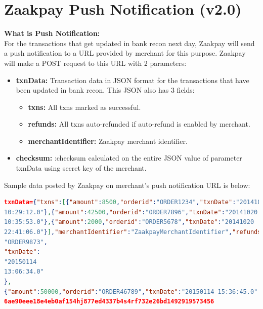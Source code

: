 \documentclass{article}
\begin{document}
\section{Zaakpay Push Notification (v2.0)}
{\bfseries What   is   Push Notification:}\\
For   the   transactions   that   get   updated   in   bank   recon   next   day,  
Zaakpay   will   send   a   push   notification   to   a   URL   provided   by   merchant   for   this   purpose.   Zaakpay  
will make a POST request to this URL with 2 parameters:  
\begin{itemize}
\item {\bfseries txnData:}   Transaction   data   in   JSON   format   for   the   transactions   that   have   been   updated   in  
bank recon. This JSON also has 3 fields: 
\begin{itemize}
\item {\bfseries txns:} All txns marked as successful. 
\item {\bfseries refunds:} All txns auto-refunded if auto-refund is enabled by merchant. 
\item {\bfseries merchantIdentifier:} Zaakpay merchant identifier.
\end{itemize}
  
 \item {\bfseries checksum:} :checksum   calculated   on   the   entire   JSON value   of   parameter   txnData   using  secret key of the merchant.  
\end{itemize}
Sample data posted by Zaakpay on merchant's push notification URL is below:  
\begin{lstlisting}[language=json,breaklines=true]
txnData={"txns":[{"amount":8500,"orderid":"ORDER1234","txnDate":"2014­10­20 
10:29:12.0"},{"amount":42500,"orderid":"ORDER7896","txnDate":"2014­10­20 
10:35:53.0"},{"amount":2000,"orderid":"ORDER5678","txnDate":"2014­10­20 
22:41:06.0"}],"merchantIdentifier":"ZaakpayMerchantIdentifier","refunds":   [   {   "amount":   10000,   "orderid":  
"ORDER9873",  
"txnDate":  
"2015­01­14  
13:06:34.0"  
},  
{"amount":50000,"orderid":"ORDER46789","txnDate":"2015­01­14 15:36:45.0" } ]}&checksum=5hgs40 
6ae90eee18e4eb0af154hj877ed4337b4s4rf732e26bd1492919573456 

\end{lstlisting}
\end{document}
